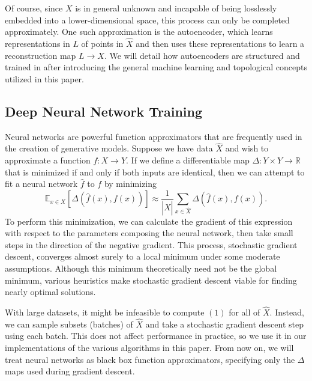 \documentclass[conference]{IEEEtran}
\newcommand{\R}{\mathbb{R}}
\begin{document}
Of course, since $X$ is in general unknown and incapable of being losslessly embedded into a lower-dimensional space, this process can only be completed approximately. One such approximation is the autoencoder, which learns representations in $L$ of points in $\hat{X}$ and then uses these representations to learn a reconstruction map $L\to X$. We will detail how autoencoders are structured and trained in  after introducing the general machine learning and topological concepts utilized in this paper.

\subsection{Deep Neural Network Training}

Neural networks are powerful function approximators that are frequently used in the creation of generative models. Suppose we have data $\hat{X}$ and wish to approximate a function $f:X\to Y$. If we define a differentiable map $\Delta:Y \times Y \to \R$ that is minimized if and only if both inputs are identical, then we can attempt to fit a neural network $\hat{f}$ to $f$ by minimizing
\begin{equation}
	\mathbb{E}_{x \in X}\left[ \Delta(\hat{f}(x),f(x)) \right] \approx \frac{1}{|\hat{X}|} \sum_{x\in \hat{X}} \Delta(\hat{f}(x),f(x)).
\end{equation}
To perform this minimization, we can calculate the gradient of this expression with respect to the parameters composing the neural network, then take small steps in the direction of the negative gradient. This process, stochastic gradient descent, converges almost surely to a local minimum under some moderate assumptions\cite{sgd-conv}. Although this minimum theoretically need not be the global minimum, various heuristics make stochastic gradient descent viable for finding nearly optimal solutions\cite{adam}.

With large datasets, it might be infeasible to compute $(1)$ for all of $\hat{X}$. Instead, we can sample subsets (batches) of $\hat{X}$ and take a stochastic gradient descent step using each batch. This does not affect performance in practice, so we use it in our implementations of the various algorithms in this paper. From now on, we will treat neural networks as black box function approximators, specifying only the $\Delta$ maps used during gradient descent.

\end{document}
